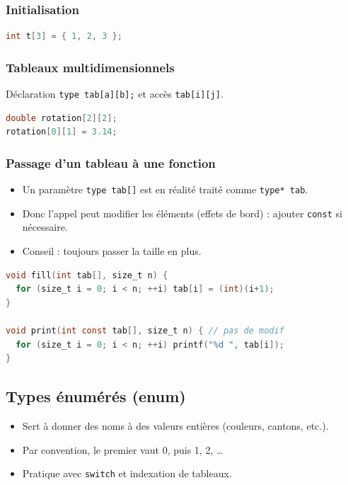 \subsubsection{Initialisation}
\begin{lstlisting}[language=C]
int t[3] = { 1, 2, 3 };
\end{lstlisting}

\subsubsection{Tableaux multidimensionnels}
Déclaration \texttt{type tab[a][b];} et accès \texttt{tab[i][j]}. 

\begin{lstlisting}[language=C]
double rotation[2][2];
rotation[0][1] = 3.14;
\end{lstlisting}

\subsubsection{Passage d’un tableau à une fonction}
\begin{itemize}
  \item Un paramètre \texttt{type tab[]} est en réalité traité comme \texttt{type* tab}.
  \item Donc l’appel peut modifier les éléments (effets de bord) : ajouter \texttt{const} si nécessaire.
  \item Conseil : toujours passer la taille en plus. 
\end{itemize}

\begin{lstlisting}[language=C]
void fill(int tab[], size_t n) {
  for (size_t i = 0; i < n; ++i) tab[i] = (int)(i+1);
}

void print(int const tab[], size_t n) { // pas de modif
  for (size_t i = 0; i < n; ++i) printf("%d ", tab[i]);
}
\end{lstlisting}

\subsection{Types énumérés (enum)}
\begin{itemize}
  \item Sert à donner des noms à des valeurs entières (couleurs, cantons, etc.). 
  \item Par convention, le premier vaut 0, puis 1, 2, … 
  \item Pratique avec \texttt{switch} et indexation de tableaux.
\end{itemize}

